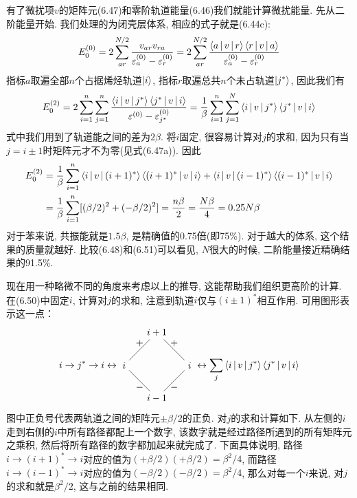 有了微扰项$v$的矩阵元(6.47)和零阶轨道能量(6.46)我们就能计算微扰能量. 先从二阶能量开始. 我们处理的为闭壳层体系, 相应的式子就是(6.44c):
\begin{align}
E_0^{(0)} = 2\sum_{ar}^{N/2}\frac{v_{ar}v_{ra}}{\varepsilon^{(0)}_a - \varepsilon^{(0)}_r} = 2 \sum_{ar}^{N/2}\frac{\Braket{a|v|r}\Braket{r|v|a}}{\varepsilon^{(0)}_a - \varepsilon^{(0)}_r}
\end{align}
指标$a$取遍全部$n$个占据烯烃轨道$\Ket{i}$, 指标$r$取遍总共$n$个未占轨道$\Ket{j^*}$, 因此我们有
\begin{align}
E_0^{(2)} = 2\sum_{i=1}^{n}\sum_{j=1}^{n}\frac{\Braket{i|v|j^*}\Braket{j^*|v|i}}{\varepsilon^{(0)}-\varepsilon^{(0)}_{j^*}} = \frac{1}{\beta}\sum_{i=1}^{n}\sum_{j=1}^{N}\Braket{i|v|j^*}\Braket{j^*|v|i}
\end{align}
式中我们用到了轨道能之间的差为$2\beta$. 将$i$固定, 很容易计算对$j$的求和, 因为只有当$j=i\pm1$时矩阵元才不为零(见式(6.47a)). 因此
\begin{align}
E_0^{(2)} & = \frac{1}{\beta}\sum_{i=1}^{n}\Braket{i|v|(i+1)^*}\Braket{(i+1)^*|v|i} + \Braket{i|v|(i-1)^*}\Braket{(i-1)^*|v|i}\notag\\
& = \frac{1}{\beta}\sum_{i=1}^{n}[(\beta/2)^2 + (-\beta/2)^2] = \frac{n\beta}{2} = \frac{N\beta}{4} = 0.25N\beta
\end{align}
对于苯来说, 共振能就是$1.5\beta$,  是精确值的0.75倍(即75\%). 对于越大的体系, 这个结果的质量就越好. 比较(6.48)和(6.51)可以看见, $N$很大的时候, 二阶能量接近精确结果的91.5\%.

现在用一种略微不同的角度来考虑以上的推导, 这能帮助我们组织更高阶的计算. 在(6.50)中固定$i$, 计算对$j$的求和, 注意到轨道$i$仅与$(i\pm1)^*$相互作用. 可用图形表示这一点：
\begin{equation*}
i\to j^* \to i\leftrightarrow
\begin{tikzpicture}[baseline={(0,-.1)},scale=1.2]
\node(a)at (0,0){$i$};\node(b)at(1,1){$i+1$};\node(c)at(2,0){$i$};\node(d)at(1,-1){$i-1$};
\draw (a)--node[above]{$+$}(b)--node[above]{$+$}(c)--node[below]{$-$}(d)--node[below]{$-$}(a);
\end{tikzpicture}\leftrightarrow \sum_j\braket{i|v|j^*}\braket{j^*|v|i}
\end{equation*}
图中正负号代表两轨道之间的矩阵元$\pm\beta/2$的正负. 对$j$的求和计算如下. 从左侧的$i$走到右侧的$i$中所有路径都配上一个数字, 该数字就是经过路径所遇到的所有矩阵元之乘积, 然后将所有路径的数字都加起来就完成了. 下面具体说明, 路径$i\to (i+1)^*\to i$对应的值为$(+\beta/2)(+\beta/2)=\beta^2/4$, 而路径$i\to (i-1)^*\to i$对应的值为$(-\beta/2)(-\beta/2)=\beta^2/4$, 那么对每一个$i$来说, 对$j$的求和就是$\beta^2/2$, 这与之前的结果相同.

